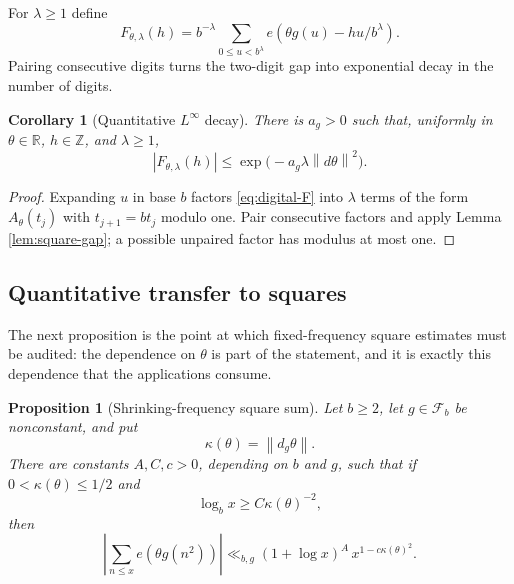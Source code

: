 \documentclass[11pt,reqno]{amsart}
\theoremstyle{plain}
\newtheorem{corollary}[theorem]{Corollary}
\newtheorem{proposition}[theorem]{Proposition}
\theoremstyle{definition}
\newcommand{\Z}{\mathbb{Z}}
\newcommand{\R}{\mathbb{R}}
\newcommand{\ee}[1]{e\!\left(#1\right)}
\newcommand{\1}{\mathbf 1}
\newcommand{\norm}[1]{\left\lVert #1\right\rVert}
\begin{document}
For $\lambda\ge1$ define
\begin{equation}\label{eq:digital-F}
 F_{\theta,\lambda}(h)=b^{-\lambda}\sum_{0\le u<b^\lambda}
 \ee{\theta g(u)-hu/b^\lambda}.
\end{equation}
Pairing consecutive digits turns the two-digit gap into exponential decay in the number of digits.

\begin{corollary}[Quantitative $L^\infty$ decay]\label{cor:square-Finfty}
There is $a_g>0$ such that, uniformly in $\theta\in\R$, $h\in\Z$, and $\lambda\ge1$,
\begin{equation}\label{eq:square-Finfty}
 |F_{\theta,\lambda}(h)|
 \le \exp\bigl(-a_g\lambda\norm{d\theta}^2\bigr).
\end{equation}
\end{corollary}

\begin{proof}
Expanding $u$ in base $b$ factors \eqref{eq:digital-F} into $\lambda$ terms of the form $A_\theta(t_j)$ with $t_{j+1}=bt_j$ modulo one.  Pair consecutive factors and apply Lemma \ref{lem:square-gap}; a possible unpaired factor has modulus at most one.
\end{proof}

\subsection{Quantitative transfer to squares}

The next proposition is the point at which fixed-frequency square estimates must be audited: the dependence on $\theta$ is part of the statement, and it is exactly this dependence that the applications consume.

\begin{proposition}[Shrinking-frequency square sum]\label{prop:square-transfer}
Let $b\ge2$, let $g\in\mathcal F_b$ be nonconstant, and put
\[
 \kappa(\theta)=\norm{d_g\theta}.
\]
There are constants $A,C,c>0$, depending on $b$ and $g$, such that if
$0<\kappa(\theta)\le1/2$ and
\begin{equation}\label{eq:square-transfer-threshold}
 \log_bx\ge C\kappa(\theta)^{-2},
\end{equation}
then
\begin{equation}\label{eq:square-transfer}
 \left|\sum_{n\le x}\ee{\theta g(n^2)}\right|
 \ll_{b,g}(1+\log x)^A\, x^{1-c\kappa(\theta)^2}.
\end{equation}
\end{proposition}
\end{document}
